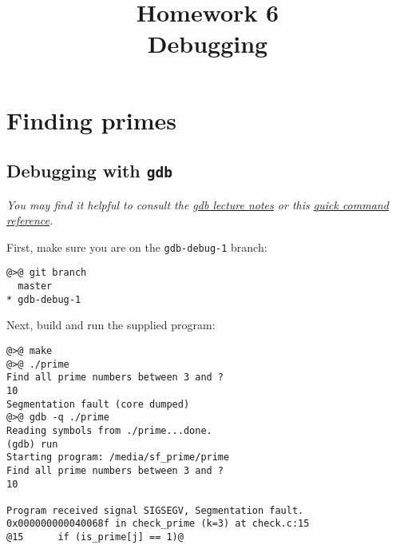 \documentclass{article}
\begin{document}
\fancyfoot[C]{\color{gray} \thepage~/~\pageref*{LastPage}}
\pagestyle{fancyplain}



\title{\textbf{Homework 6\\Debugging}}
\author{\textbf{\color{violet}{Solutions}}}
\date{}
\maketitle


\setcounter{section}{1}
\section{Finding primes}

\subsection{Debugging with \texttt{gdb}}

\emph{You may find it helpful to consult the
  \href{http://c4cs.github.io/static/lecture/wk7-gdb.pdf}{gdb lecture notes}
  or this
  \href{https://ccrma.stanford.edu/~jos/stkintro/Useful_commands_gdb.html}
  {quick command reference}.
}



First, make sure you are on the \texttt{gdb-debug-1} branch:
\begin{lstlisting}
@>@ git branch
  master
* gdb-debug-1
\end{lstlisting}

Next, build and run the supplied program:
\begin{lstlisting}
@>@ make
@>@ ./prime
Find all prime numbers between 3 and ?
10
Segmentation fault (core dumped)
@>@ gdb -q ./prime
Reading symbols from ./prime...done.
(gdb) run
Starting program: /media/sf_prime/prime 
Find all prime numbers between 3 and ?
10

Program received signal SIGSEGV, Segmentation fault.
0x000000000040068f in check_prime (k=3) at check.c:15
@15      if (is_prime[j] == 1)@
\end{lstlisting}
\end{document}
